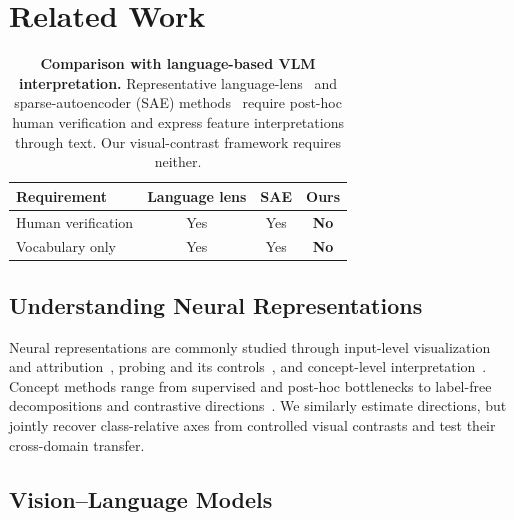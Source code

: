 

\section{Related Work}
\label{sec:rel_wrk}


\begin{table}[t]
    \centering
    \footnotesize
    \setlength{\tabcolsep}{5pt}
    \begin{tabular}{lccc}
        \toprule
        Requirement & Language lens & SAE & Ours \\
        \midrule
        Human verification & Yes & Yes & \textbf{No} \\
        Vocabulary only & Yes & Yes & \textbf{No} \\
        \bottomrule
    \end{tabular}
    \caption{\textbf{Comparison with language-based VLM interpretation.}
        Representative language-lens~\cite{NeoEtAl2025,KrojerEtAl2026} and
        sparse-autoencoder (SAE) methods~\cite{ZaigrajewEtAl2025,
        PachEtAl2025} require post-hoc human verification and express feature
        interpretations through text. Our visual-contrast framework requires
        neither.}
    \label{tab:related_work_comparison}
\end{table}

\subsection{Understanding Neural Representations}

Neural representations are commonly studied through input-level visualization and
attribution~\cite{ZeilerFergus2014,SimonyanEtAl2014,OlahEtAl2017,SelvarajuEtAl2017},
probing and its controls~\cite{AlainBengio2017,Belinkov2022,HewittLiang2019}, and
concept-level interpretation~\cite{BauEtAl2017,KimEtAl2018,GhorbaniEtAl2019}.
Concept methods range from supervised and post-hoc bottlenecks to label-free
decompositions and contrastive directions~\cite{KohEtAl2020,YuksekgonulEtAl2023,
OikarinenEtAl2023LF,CunninghamEtAl2023,ZouEtAl2023}.  We similarly estimate
directions, but jointly recover class-relative axes from controlled visual contrasts
and test their cross-domain transfer.

\subsection{Vision--Language Models}

